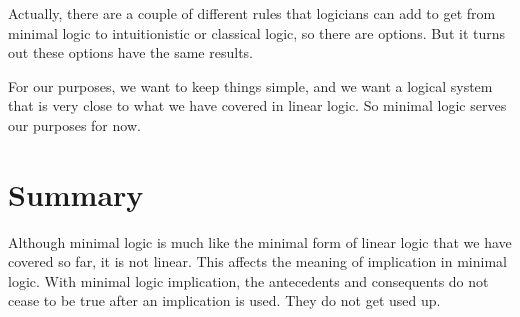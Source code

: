 \documentclass[../../../main.tex]{subfiles}
\begin{document}
\noindent
Actually, there are a couple of different rules that logicians can add to get from minimal logic to intuitionistic or classical logic, so there are options. But it turns out these options have the same results.

For our purposes, we want to keep things simple, and we want a logical system that is very close to what we have covered in linear logic. So minimal logic serves our purposes for now.


\section{Summary}

Although minimal logic is much like the minimal form of linear logic that we have covered so far, it is not linear. This affects the meaning of implication in minimal logic. With minimal logic implication, the antecedents and consequents do not cease to be true after an implication is used. They do not get used up.
\end{document}
